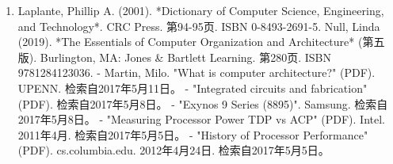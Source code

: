 \begin{enumerate}
\item Laplante, Phillip A. (2001). *Dictionary of Computer Science, Engineering, and Technology*. CRC Press. 第94-95页. ISBN 0-8493-2691-5.  
Null, Linda (2019). *The Essentials of Computer Organization and Architecture* (第五版). Burlington, MA: Jones & Bartlett Learning. 第280页. ISBN 9781284123036.  
- Martin, Milo. "What is computer architecture?" (PDF). UPENN. 检索自2017年5月11日。  
- "Integrated circuits and fabrication" (PDF). 检索自2017年5月8日。  
- "Exynos 9 Series (8895)". Samsung. 检索自2017年5月8日。  
- "Measuring Processor Power TDP vs ACP" (PDF). Intel. 2011年4月. 检索自2017年5月5日。  
- "History of Processor Performance" (PDF). cs.columbia.edu. 2012年4月24日. 检索自2017年5月5日。  
\end{enumerate}